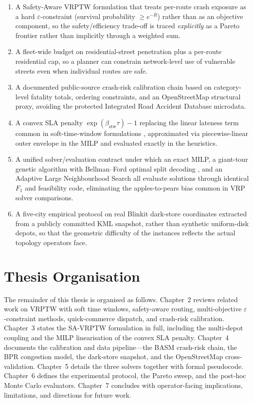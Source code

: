 \begin{enumerate}
    \item A Safety-Aware VRPTW formulation that treats per-route
    crash exposure as a hard $\varepsilon$-constraint
    (survival probability $\geq e^{-\bar{R}}$) rather than as an
    objective component, so the safety/efficiency trade-off is traced
    \emph{explicitly} as a Pareto frontier
    \citep{salmon2023,ehrgott2005} rather than implicitly through a
    weighted sum.
    \item A fleet-wide budget on residential-street penetration plus
    a per-route residential cap, so a planner can constrain
    network-level use of vulnerable streets even when individual
    routes are safe.
    \item A documented public-source crash-risk calibration chain
    based on \citet{morth2022} category-level fatality totals,
    \citet{mohan2017} ordering constraints, and an OpenStreetMap
    structural proxy, avoiding the protected Integrated Road Accident
    Database microdata.
    \item A convex SLA penalty $\exp(\beta_{\text{stw}}\tau)-1$
    replacing the linear lateness term common in soft-time-window
    formulations \citep{koskosidis1992,fu2008,taillard1997},
    approximated via piecewise-linear outer envelope in the MILP and
    evaluated exactly in the heuristics.
    \item A unified solver/evaluation contract under which an exact
    MILP, a giant-tour genetic algorithm with Bellman--Ford optimal
    split decoding \citep{prins2004}, and an Adaptive Large
    Neighbourhood Search \citep{ropke2006} all evaluate solutions
    through identical $F_1$ and feasibility code, eliminating the
    apples-to-pears bias common in VRP solver comparisons.
    \item A five-city empirical protocol on real Blinkit dark-store
    coordinates extracted from a publicly committed KML snapshot,
    rather than synthetic uniform-disk depots, so that the geometric
    difficulty of the instances reflects the actual topology
    operators face.
\end{enumerate}

\section{Thesis Organisation}

The remainder of this thesis is organised as follows. Chapter~2
reviews related work on VRPTW with soft time windows, safety-aware
routing, multi-objective $\varepsilon$-constraint methods,
quick-commerce dispatch, and crash-risk calibration. Chapter~3 states
the SA-VRPTW formulation in full, including the multi-depot coupling
and the MILP linearisation of the convex SLA penalty. Chapter~4
documents the calibration and data pipeline---the BASM crash-risk
chain, the BPR congestion model, the dark-store snapshot, and the
OpenStreetMap cross-validation. Chapter~5 details the three solvers
together with formal pseudocode. Chapter~6 defines the experimental
protocol, the Pareto sweep, and the post-hoc Monte Carlo evaluators.
Chapter~7 concludes with operator-facing implications, limitations,
and directions for future work.

